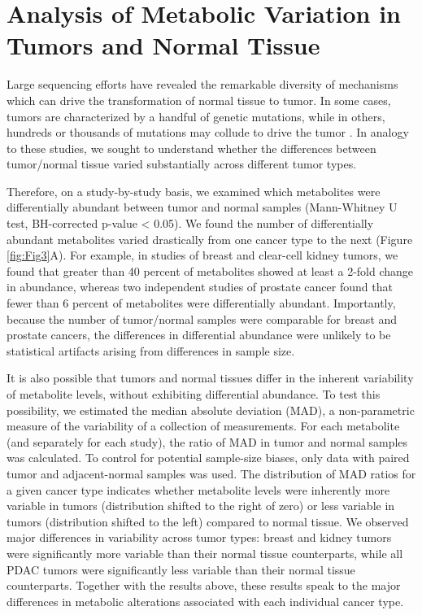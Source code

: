 \documentclass[10pt]{article}
\begin{document}
\section{Analysis of Metabolic Variation in Tumors and Normal Tissue}
Large sequencing efforts have revealed the remarkable diversity of mechanisms which can drive the transformation of normal tissue to tumor. In some cases, tumors are characterized by a handful of genetic mutations, while in others, hundreds or thousands of mutations may collude to drive the tumor \cite{Martincorena2015}. In analogy to these studies, we sought to understand whether the differences between tumor/normal tissue varied substantially across different tumor types. 

Therefore, on a study-by-study basis, we examined which metabolites were differentially abundant between tumor and normal samples (Mann-Whitney U test, BH-corrected p-value < 0.05). We found the number of differentially abundant metabolites varied drastically from one cancer type to the next (Figure \ref{fig:Fig3}A). For example, in studies of breast and clear-cell kidney tumors, we found that greater than 40 percent of metabolites showed at least a 2-fold change in abundance, whereas two independent studies of prostate cancer found that fewer than 6 percent of metabolites were differentially abundant. Importantly, because the number of tumor/normal samples were comparable for breast and prostate cancers, the differences in differential abundance were unlikely to be statistical artifacts arising from differences in sample size. 

It is also possible that tumors and normal tissues differ in the inherent variability of metabolite levels, without exhibiting differential abundance. To test this possibility, we estimated the median absolute deviation (MAD), a non-parametric measure of the variability of a collection of measurements. For each metabolite (and separately for each study), the ratio of MAD in tumor and normal samples was calculated. To control for potential sample-size biases, only data with paired tumor and adjacent-normal samples was used. The distribution of MAD ratios for a given cancer type indicates whether metabolite levels were inherently more variable in tumors (distribution shifted to the right of zero) or less variable in tumors (distribution shifted to the left) compared to normal tissue. We observed major differences in variability across tumor types: breast and kidney tumors were significantly more variable than their normal tissue counterparts, while all PDAC tumors were significantly less variable than their normal tissue counterparts. Together with the results above, these results speak to the major differences in metabolic alterations associated with each individual cancer type. 
\end{document}

